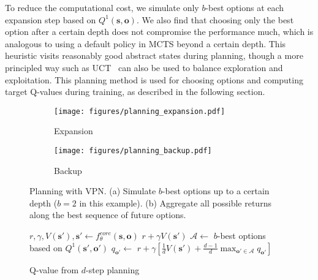 \documentclass{article}
\newcommand{\option}{o}
\begin{document}
To reduce the computational cost, we simulate only $b$-best options at each expansion step based on $Q^1(\textbf{s},\textbf{\option{}})$. We also find that choosing only the best option after a certain depth does not compromise the performance much, which is analogous to using a default policy in MCTS beyond a certain depth. This heuristic visits reasonably good abstract states during planning, though a more principled way such as UCT~\cite{kocsis2006bandit} can also be used to balance exploration and exploitation. This planning method is used for choosing options and computing target Q-values during training, as described in the following section.



\begin{figure}
\centering
\begin{minipage}{.53\textwidth}
	\centering
	\begin{subfigure}{0.49\linewidth}	
		\texttt{[image: figures/planning\_expansion.pdf]}
  		\caption{Expansion }
  		\label{fig:planning-expansion}
	\end{subfigure}
	\hfill
	\begin{subfigure}{0.49\linewidth}	
		\texttt{[image: figures/planning\_backup.pdf]}
  		\caption{Backup }
  		\label{fig:planning-backup}
	\end{subfigure}
	\vspace{-5pt}
	\caption{Planning with VPN. (a) Simulate $b$-best options up to a certain depth ($b=2$ in this example). (b) Aggregate all possible returns along the best sequence of future options. }\label{fig:planning}
\end{minipage}
\hfill
\begin{minipage}{.45\textwidth}
\vspace{-0.4in}
\begin{algorithm}[H]
\small
\caption{Q-value from $d$-step planning}\label{alg:planning}
\begin{algorithmic}
\Function{Q-Plan}{$\textbf{s},\textbf{\option{}},d$}
    \State $r,\gamma,V(\textbf{s}'),\textbf{s}' \gets f^{core}_\theta(\textbf{s},\textbf{\option{}})$
		\State \Return $r + \gamma V(\textbf{s}')$
	\EndIf
	\State $\mathcal{A} \gets $ $b$-best options based on $Q^1(\textbf{s}',\textbf{\option{}}')$
\For {$\textbf{\option{}}' \in \mathcal{A}$}
		\State $q_{\textbf{\option{}}'} \gets $ \Call{Q-Plan}{$\textbf{s}', \textbf{\option{}}', d-1$}
	\EndFor
    \State \Return $r + \gamma \left[ \frac{1}{d} V(\textbf{s}') + \frac{d-1}{d} \max_{\textbf{\option{}}'\in\mathcal{A}}q_{\textbf{\option{}}'} \right] $
\EndFunction
\end{algorithmic}
\end{algorithm}
\vspace{-0.4in}
\end{minipage}
\vspace{-10pt}
\end{figure}
\end{document}
